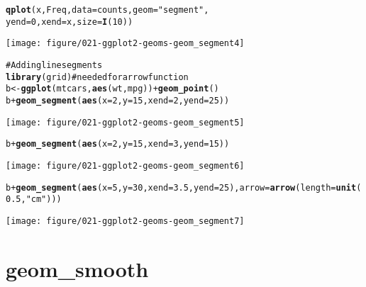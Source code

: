 \documentclass[a4paper,titlepage]{tufte-handout}\usepackage{graphicx, color}
\makeatletter
\def\maxwidth{ %
  \ifdim\Gin@nat@width>\linewidth
    \linewidth
  \else
    \Gin@nat@width
  \fi
}
\newcommand{\hlfunctioncall}[1]{\textcolor[rgb]{0.501960784313725,0,0.329411764705882}{\textbf{#1}}}%
\newcommand{\hlstring}[1]{\textcolor[rgb]{0.6,0.6,1}{#1}}%
\newcommand{\hlcomment}[1]{\textcolor[rgb]{0.180392156862745,0.6,0.341176470588235}{#1}}%
\newenvironment{kframe}{%
 \def\at@end@of@kframe{}%
 \ifinner\ifhmode%
  \def\at@end@of@kframe{\end{minipage}}%
  \begin{minipage}{\columnwidth}%
 \fi\fi%
 \def\FrameCommand##1{\hskip\@totalleftmargin \hskip-\fboxsep
 \colorbox{shadecolor}{##1}\hskip-\fboxsep
     \hskip-\linewidth \hskip-\@totalleftmargin \hskip\columnwidth}%
 \MakeFramed {\advance\hsize-\width
   \@totalleftmargin\z@ \linewidth\hsize
   \@setminipage}}%
 {\par\unskip\endMakeFramed%
 \at@end@of@kframe}
\newenvironment{knitrout}{}{} %
\makeatother
\begin{document}
\begin{knitrout}
\begin{kframe}
\begin{alltt}
\hlfunctioncall{qplot}(x, Freq, data = counts, geom = \hlstring{"segment"},
  yend = 0, xend = x, size = \hlfunctioncall{I}(10))
\end{alltt}
\end{kframe}
\texttt{[image: figure/021-ggplot2-geoms-geom\_segment4]} 
\begin{kframe}\begin{alltt}

\hlcomment{# Adding line segments}
\hlfunctioncall{library}(grid) \hlcomment{# needed for arrow function}
b <- \hlfunctioncall{ggplot}(mtcars, \hlfunctioncall{aes}(wt, mpg)) + \hlfunctioncall{geom_point}()
b + \hlfunctioncall{geom_segment}(\hlfunctioncall{aes}(x = 2, y = 15, xend = 2, yend = 25))
\end{alltt}
\end{kframe}
\texttt{[image: figure/021-ggplot2-geoms-geom\_segment5]} 
\begin{kframe}\begin{alltt}
b + \hlfunctioncall{geom_segment}(\hlfunctioncall{aes}(x = 2, y = 15, xend = 3, yend = 15))
\end{alltt}
\end{kframe}
\texttt{[image: figure/021-ggplot2-geoms-geom\_segment6]} 
\begin{kframe}\begin{alltt}
b + \hlfunctioncall{geom_segment}(\hlfunctioncall{aes}(x = 5, y = 30, xend = 3.5, yend = 25), arrow = \hlfunctioncall{arrow}(length = \hlfunctioncall{unit}(0.5, \hlstring{"cm"})))
\end{alltt}
\end{kframe}
\texttt{[image: figure/021-ggplot2-geoms-geom\_segment7]} 
\begin{kframe}\begin{alltt}


\end{alltt}
\end{kframe}
\end{knitrout}



\section{geom\_smooth}
\end{document}
